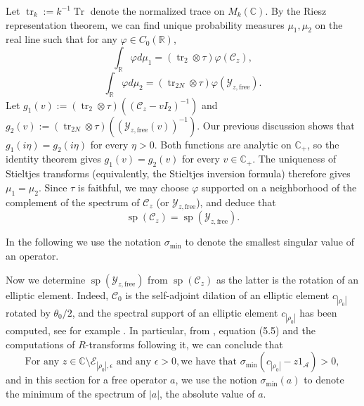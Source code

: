 \documentclass[11pt,reqno]{amsart}
\theoremstyle{plain}
\theoremstyle{remark}
\numberwithin{equation}{section}
\begin{document}
Let $\operatorname{tr}_k:=k^{-1}\operatorname{Tr}$ denote the normalized trace on $M_k(\mathbb{C})$. By the Riesz representation theorem, we can find unique probability measures $\mu_1,\mu_2$ on the real line such that for any $\varphi\in C_0(\mathbb{R})$,
$$
\int_\mathbb{R}\varphi d\mu_1=(\operatorname{tr}_2\otimes\tau)\varphi(\mathcal{C}_z),
$$
$$
\int_\mathbb{R}\varphi d\mu_2=(\operatorname{tr}_{2N}\otimes\tau)\varphi(\mathcal{Y}_{z,\text{free}}).
$$
Let $g_1(v):=(\operatorname{tr}_2\otimes\tau)((\mathcal{C}_z-vI_2)^{-1})$ and  $g_2(v):=(\operatorname{tr}_{2N}\otimes\tau)((\mathcal{Y}_{z,\text{free}}(v))^{-1})$. Our previous discussion shows that $g_1(i\eta)=g_2(i\eta)$ for every $\eta>0$. Both functions are analytic on $\mathbb{C}_+$, so the identity theorem gives $g_1(v)=g_2(v)$ for every $v\in\mathbb{C}_+$. The uniqueness of Stieltjes transforms (equivalently, the Stieltjes inversion formula) therefore gives $\mu_1=\mu_2$. Since $\tau$ is faithful, we may choose $\varphi$ supported on a neighborhood of the complement of the spectrum of $\mathcal{C}_z$ (or $\mathcal{Y}_{z,\text{free}}$), and deduce that \begin{equation}\label{previousidentifications}\operatorname{sp}(\mathcal{C}_z)=\operatorname{sp}(\mathcal{Y}_{z,\text{free}}).\end{equation}

In the following we use the notation $\sigma_{\min}$ to denote the smallest singular value of an operator.


Now we determine $\operatorname{sp}(\mathcal{Y}_{z,\text{free}})$ from $\operatorname{sp}(\mathcal{C}_z)$ as the latter is the rotation of an elliptic element. Indeed, $\mathcal{C}_0$ is the self-adjoint dilation of an elliptic element $c_{|\rho_0|}$ rotated by $\theta_0/2$, and the spectral support of an elliptic element $c_{|\rho_0|}$ has been computed, see for example \cite{biane1999computation}. In particular, from \cite{biane1999computation}, equation (5.5) and the computations of $R$-transforms following it, we can conclude that $$ \text{For any } z\in\mathbb{C}\setminus\mathcal{E}_{|\rho_0|,\epsilon} \text{ and any } \epsilon>0, \text{we have that } \sigma_{\min}(c_{|\rho_0|}-z1_\mathcal{A})>0,$$ 
and in this section for a free operator $a$, we use the notion $\sigma_{\min}(a)$ to denote the minimum of the spectrum of $|a|$, the absolute value of $a$.
\end{document}

